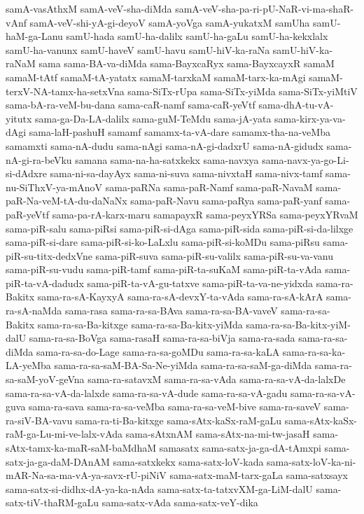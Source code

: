 {samA-vasAthxM
samA-veV-sha-diMda
samA-veV-sha-pa-ri-pU-NaR-vi-ma-shaR-vAnf
samA-veV-shi-yA-gi-deyoV
samA-yoVga
samA-yukatxM
samUha
samU-haM-ga-Lanu
samU-hada
samU-ha-dalilx
samU-ha-gaLu
samU-ha-kekxlalx
samU-ha-vanunx
samU-haveV
samU-havu
samU-hiV-ka-raNa
samU-hiV-ka-raNaM
sama
sama-BA-va-diMda
sama-BayxcaRyx
sama-BayxcayxR
samaM
samaM-tAtf
samaM-tA-yatatx
samaM-tarxkaM
samaM-tarx-ka-mAgi
samaM-terxV-NA-tamx-ha-setxVna
sama-SiTx-rUpa
sama-SiTx-yiMda
sama-SiTx-yiMtiV
sama-bA-ra-veM-bu-dana
sama-caR-namf
sama-caR-yeVtf
sama-dhA-tu-vA-yitutx
sama-ga-Da-LA-dalilx
sama-guM-TeMdu
sama-jA-yata
sama-kirx-ya-va-dAgi
sama-laH-pashuH
samamf
samamx-ta-vA-dare
samamx-tha-na-veMba
samamxti
sama-nA-dudu
sama-nAgi
sama-nA-gi-dadxrU
sama-nA-gidudx
sama-nA-gi-ra-beVku
samana
sama-na-ha-satxkekx
sama-navxya
sama-navx-ya-go-Li-si-dAdxre
sama-ni-sa-dayAyx
sama-ni-suva
sama-nivxtaH
sama-nivx-tamf
sama-nu-SiThxV-ya-mAnoV
sama-paRNa
sama-paR-Namf
sama-paR-NavaM
sama-paR-Na-veM-tA-du-daNaNx
sama-paR-Navu
sama-paRya
sama-paR-yanf
sama-paR-yeVtf
sama-pa-rA-karx-maru
samapayxR
sama-peyxYRSa
sama-peyxYRvaM
sama-piR-salu
sama-piRsi
sama-piR-si-dAga
sama-piR-sida
sama-piR-si-da-lilxge
sama-piR-si-dare
sama-piR-si-ko-LaLxlu
sama-piR-si-koMDu
sama-piRsu
sama-piR-su-titx-dedxVne
sama-piR-suva
sama-piR-su-valilx
sama-piR-su-va-vanu
sama-piR-su-vudu
sama-piR-tamf
sama-piR-ta-suKaM
sama-piR-ta-vAda
sama-piR-ta-vA-dadudx
sama-piR-ta-vA-gu-tatxve
sama-piR-ta-va-ne-yidxda
sama-ra-Bakitx
sama-ra-sA-KayxyA
sama-ra-sA-devxY-ta-vAda
sama-ra-sA-kArA
sama-ra-sA-naMda
sama-rasa
sama-ra-sa-BAva
sama-ra-sa-BA-vaveV
sama-ra-sa-Bakitx
sama-ra-sa-Ba-kitxge
sama-ra-sa-Ba-kitx-yiMda
sama-ra-sa-Ba-kitx-yiM-dalU
sama-ra-sa-BoVga
sama-rasaH
sama-ra-sa-biVja
sama-ra-sada
sama-ra-sa-diMda
sama-ra-sa-do-Lage
sama-ra-sa-goMDu
sama-ra-sa-kaLA
sama-ra-sa-ka-LA-yeMba
sama-ra-sa-saM-BA-Sa-Ne-yiMda
sama-ra-sa-saM-ga-diMda
sama-ra-sa-saM-yoV-geVna
sama-ra-satavxM
sama-ra-sa-vAda
sama-ra-sa-vA-da-lalxDe
sama-ra-sa-vA-da-lalxde
sama-ra-sa-vA-dude
sama-ra-sa-vA-gadu
sama-ra-sa-vA-guva
sama-ra-sava
sama-ra-sa-veMba
sama-ra-sa-veM-bive
sama-ra-saveV
sama-ra-siV-BA-vavu
sama-ra-ti-Ba-kitxge
sama-sAtx-kaSx-raM-gaLu
sama-sAtx-kaSx-raM-ga-Lu-mi-ve-lalx-vAda
sama-sAtxnAM
sama-sAtx-na-mi-tw-jasaH
sama-sAtx-tamx-ka-maR-saM-baMdhaM
samasatx
sama-satx-ja-ga-dA-tAmxpi
sama-satx-ja-ga-daM-DAnAM
sama-satxkekx
sama-satx-loV-kada
sama-satx-loV-ka-ni-mAR-Na-sa-ma-vA-ya-savx-rU-piNiV
sama-satx-maM-tarx-gaLa
sama-satxsayx
sama-satx-si-didhx-dA-ya-ka-nAda
sama-satx-ta-tatxvXM-ga-LiM-dalU
sama-satx-tiV-thaRM-gaLu
sama-satx-vAda
sama-satx-veY-dika
}
